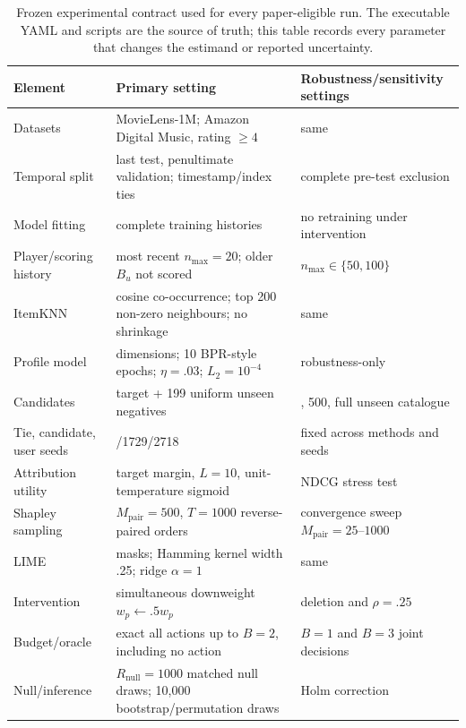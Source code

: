 \documentclass[manuscript,screen,review,anonymous]{acmart}
\begin{document}
\begin{table}[!htbp]
\centering\scriptsize
\setlength{\tabcolsep}{3pt}
\caption{Frozen experimental contract used for every paper-eligible run. The executable YAML and scripts are the source of truth; this table records every parameter that changes the estimand or reported uncertainty.}
\label{tab:app-contract}
\begin{tabular}{@{}>{\raggedright\arraybackslash}p{}>{\raggedright\arraybackslash}p{}>{\raggedright\arraybackslash}p{}@{}}
\toprule
Element & Primary setting & Robustness/sensitivity settings\\
\midrule
Datasets & MovieLens-1M; Amazon Digital Music, rating $\ge4$ & same\\
Temporal split & last test, penultimate validation; timestamp/index ties & complete pre-test exclusion\\
Model fitting & complete training histories & no retraining under intervention\\
Player/scoring history & most recent $n_{\max}=20$; older $B_u$ not scored & $n_{\max}\in\{50,100\}$\\
ItemKNN & cosine co-occurrence; top 200 non-zero neighbours; no shrinkage & same\\
Profile model & 64 dimensions; 10 BPR-style epochs; $\eta=.03$; $L_2=10^{-4}$ & robustness-only\\
Candidates & target + 199 uniform unseen negatives & 100, 500, full unseen catalogue\\
Tie, candidate, user seeds & 31415/1729/2718 & fixed across methods and seeds\\
Attribution utility & target margin, $L=10$, unit-temperature sigmoid & NDCG stress test\\
Shapley sampling & $M_{\mathrm{pair}}=500$, $T=1000$ reverse-paired orders & convergence sweep $M_{\mathrm{pair}}=25$--$1000$\\
LIME & 512 masks; Hamming kernel width .25; ridge $\alpha=1$ & same\\
Intervention & simultaneous downweight $w_p\leftarrow.5w_p$ & deletion and $\rho=.25$\\
Budget/oracle & exact all actions up to $B=2$, including no action & $B=1$ and $B=3$ joint decisions\\
Null/inference & $R_{\mathrm{null}}=1000$ matched null draws; 10,000 bootstrap/permutation draws & Holm correction\\
\bottomrule
\end{tabular}
\end{table}
\end{document}
